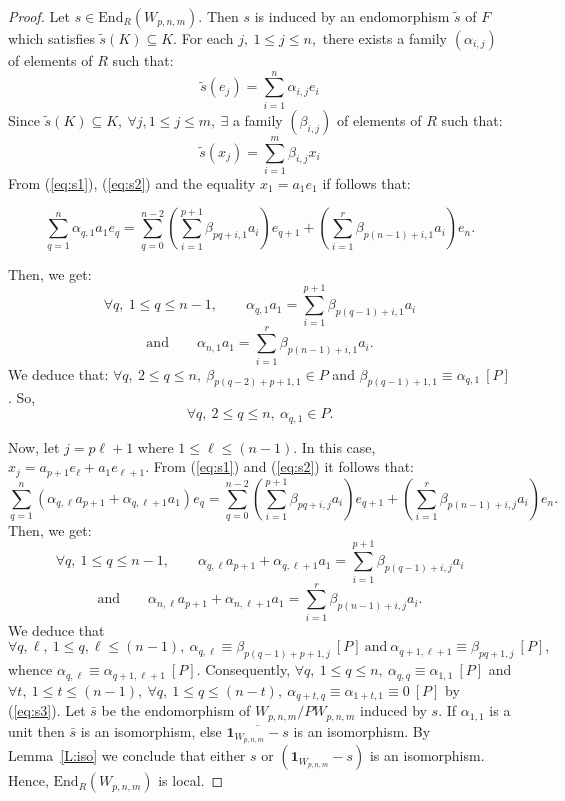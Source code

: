 \documentclass{amsart}
\begin{document}
\begin{proof}
Let $s\in \mathrm{End}_R(W_{p,n,m})$. Then $s$ is
induced by an endomorphism $\tilde{s}$ of $F$ which satisfies
$\tilde{s}(K)\subseteq K$. For each $j,\ 1\leq j\leq n,$ there exists a family $(\alpha_{i,j})$ of elements of $R$ such that:
\begin{equation} \label{eq:s1}
\tilde{s}(e_j)=\sum_{i=1}^{n}\alpha_{i,j}e_i
\end{equation}
Since $\tilde{s}(K)\subseteq K,\ \forall j, 1\leq j\leq  m,\ \exists$ a
 family $(\beta_{i,j})$ of elements of $R$ such that:
\begin{equation} \label{eq:s2}
\tilde{s}(x_j)=\sum_{i=1}^{m}\beta_{i,j}x_i
\end{equation}
From (\ref{eq:s1}), (\ref{eq:s2}) and the equality $x_1=a_1e_1$
if follows that:

\[\sum_{q=1}^{n}\alpha_{q,1}a_1e_q=\sum_{q=0}^{n-2}\left( \sum_{i=1}^{p+1}\beta_{pq+i,1}a_i\right) e_{q+1}+\left( \sum_{i=1}^{r}\beta_{p(n-1)+i,1}a_{i}\right) e_n.\]

Then,  we get:
\[\forall q,\ 1\leq q\leq n-1,\qquad \alpha_{q,1}a_1=\sum_{i=1}^{p+1}\beta_{p(q-1)+i,1}a_i\]
\[\mathrm{and}\qquad\alpha_{n,1}a_1=\sum_{i=1}^{r}\beta_{p(n-1)+i,1}a_{i}.\]
We deduce that: $\forall q,\ 2\leq q\leq n,\ \beta_{p(q-2)+p+1,1}\in P$ and $\beta_{p(q-1)+1,1}\equiv \alpha_{q,1}\ [P]$. So, 
\begin{equation}\label{eq:s3}
\forall q,\ 2\leq q\leq n,\ \alpha_{q,1}\in P.
\end{equation}



Now, let $j=p\ell+1$ where $1\leq \ell\leq (n-1)$. In this case, $x_j=a_{p+1}e_{\ell}+a_1e_{\ell+1}$. From (\ref{eq:s1}) and (\ref{eq:s2}) it follows that:
\[\sum_{q=1}^{n}(\alpha_{q,\ell}a_{p+1}+\alpha_{q,\ell+1}a_1)e_q=\sum_{q=0}^{n-2}\left( \sum_{i=1}^{p+1}\beta_{pq+i,j}a_i\right) e_{q+1}+\left( \sum_{i=1}^{r}\beta_{p(n-1)+i,j}a_{i}\right) e_n.\]
Then,  we get:
\[\forall q,\ 1\leq q\leq n-1,\qquad \alpha_{q,\ell}a_{p+1}+\alpha_{q,\ell+1}a_1=\sum_{i=1}^{p+1}\beta_{p(q-1)+i,j}a_i\]
\[\mathrm{and}\qquad\alpha_{n,\ell}a_{p+1}+\alpha_{n,\ell+1}a_1=\sum_{i=1}^{r}\beta_{p(n-1)+i,j}a_{i}.\]
We deduce that \[\forall q,\ell,\ 1\leq q,\ell\leq (n-1),\ \alpha_{q,\ell}\equiv \beta_{p(q-1)+p+1,j}\ [P]\ \mathrm{and}\ \alpha_{q+1,\ell+1}\equiv \beta_{pq+1,j}\ [P],\] whence $\alpha_{q,\ell}\equiv\alpha_{q+1,\ell+1}\ [P]$. Consequently, $\forall q,\ 1\leq q\leq n,\ \alpha_{q,q}\equiv \alpha_{1,1}\ [P]$ and $\forall t,\ 1\leq t\leq (n-1),\ \forall q,\ 1\leq q\leq (n-t),\ \alpha_{q+t,q}\equiv \alpha_{1+t,1}\equiv 0\ [P]$ by (\ref{eq:s3}). Let $\bar{s}$ be the endomorphism of $W_{p,n,m}/PW_{p,n,m}$ induced by $s$. If $\alpha_{1,1}$ is a unit then $\bar{s}$ is an isomorphism, else $\overline{\mathbf{1}_{W_{p,n,m}}-s}$ is an isomorphism. By Lemma~\ref{L:iso} we conclude that either $s$  or $(\mathbf{1}_{W_{p,n,m}}-s)$ is an isomorphism.  Hence, $\mathrm{End}_R(W_{p,n,m})$ is local. \end{proof}
\end{document}
